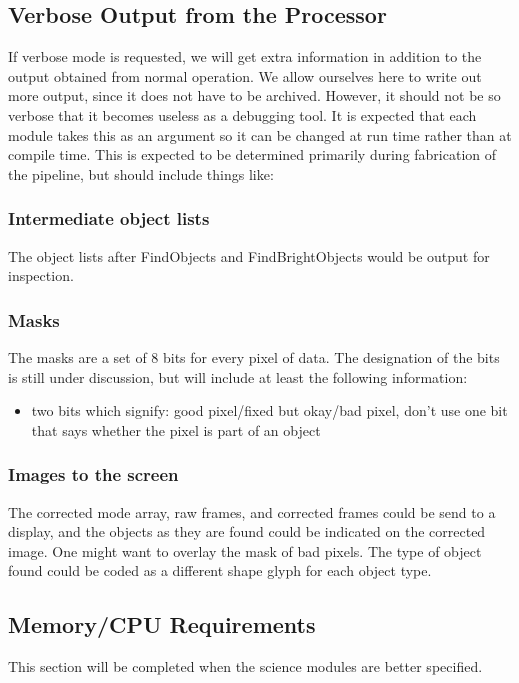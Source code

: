 \subsection{Verbose Output from the Processor}

	If verbose mode is requested, we will get extra information
in addition to the output obtained from normal operation.
We allow ourselves here to write out more output, since it does not
have to be archived.  However, it should not be so  verbose that
it becomes useless as a debugging tool.  It is expected that each module
takes this as an argument so it can be changed at run time rather than
at compile time.  This is expected to be determined
primarily during fabrication of the pipeline, but should include things
like:

\subsubsection{Intermediate object lists}

	The object lists after FindObjects and FindBrightObjects would
be output for inspection.

\subsubsection{Masks}

	The masks are a set of 8 bits for every pixel of data.  The
designation of the bits is still under discussion, but will include
at least the following information:
\begin{itemize}
\item two bits which signify: good pixel/fixed but okay/bad pixel, don't use
\sitem one bit that says whether the pixel is part of an object
\end{itemize}

\subsubsection{Images to the screen}

	The corrected mode array, raw frames, and corrected frames could
be send to a display, and the objects as they are found could be indicated
on the corrected image.  One might want to overlay the mask of bad pixels.
The type of object found could be coded as a different shape glyph for each
object type.

\subsection{Memory/CPU Requirements}

This section will be completed when the science modules are better specified.

